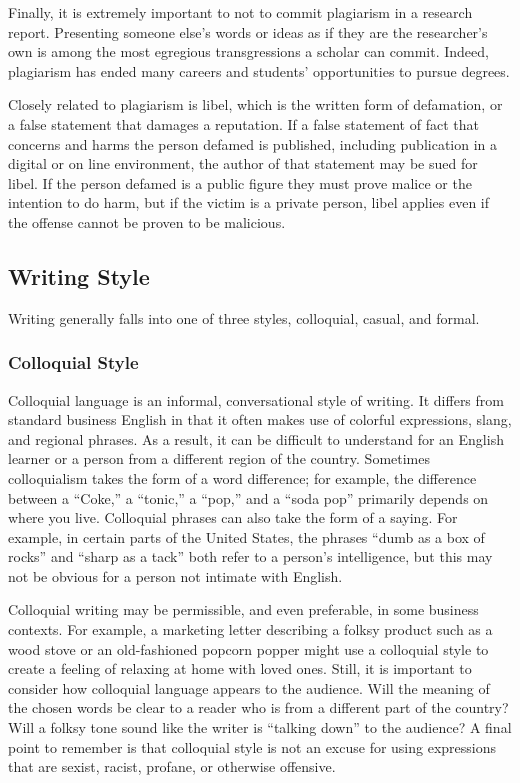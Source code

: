 Finally, it is extremely important to not to commit plagiarism in a research report. Presenting someone else's words or ideas as if they are the researcher's own is among the most egregious transgressions a scholar can commit. Indeed, plagiarism has ended many careers and students' opportunities to pursue degrees\cite{maurer2006plagiarism}.

Closely related to plagiarism is libel, which is the written form of defamation, or a false statement that damages a reputation. If a false statement of fact that concerns and harms the person defamed is published, including publication in a digital or on line environment, the author of that statement may be sued for libel. If the person defamed is a public figure they must prove malice or the intention to do harm, but if the victim is a private person, libel applies even if the offense cannot be proven to be malicious. 

\subsection{Writing Style}

Writing generally falls into one of three styles, colloquial, casual, and formal.

\subsubsection{Colloquial Style}

Colloquial language is an informal, conversational style of writing. It differs from standard business English in that it often makes use of colorful expressions, slang, and regional phrases. As a result, it can be difficult to understand for an English learner or a person from a different region of the country. Sometimes colloquialism takes the form of a word difference; for example, the difference between a ``Coke,'' a ``tonic,'' a ``pop,'' and a ``soda pop'' primarily depends on where you live. Colloquial phrases can also take the form of a saying. For example, in certain parts of the United States, the phrases ``dumb as a box of rocks'' and ``sharp as a tack'' both refer to a person's intelligence, but this may not be obvious for a person not intimate with English.

Colloquial writing may be permissible, and even preferable, in some business contexts. For example, a marketing letter describing a folksy product such as a wood stove or an old-fashioned popcorn popper might use a colloquial style to create a feeling of relaxing at home with loved ones. Still, it is important to consider how colloquial language  appears to the audience. Will the meaning of the chosen words be clear to a reader who is from a different part of the country? Will a folksy tone sound like the writer is ``talking down'' to the audience? A final point to remember is that colloquial style is not an excuse for using expressions that are sexist, racist, profane, or otherwise offensive.

